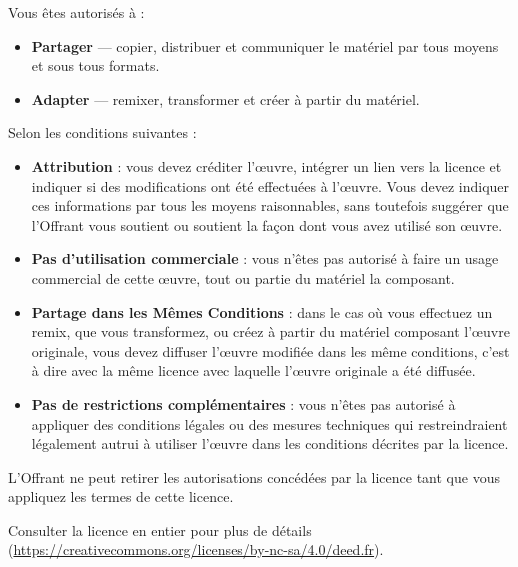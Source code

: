 \documentclass{article}
\begin{document}
\medskip

Vous êtes autorisés à :

\begin{itemize}
	\item \textbf{Partager} --- copier, distribuer et communiquer le matériel par tous moyens et sous tous formats.
	\item \textbf{Adapter} --- remixer, transformer et créer à partir du matériel.
\end{itemize}

\bigskip

Selon les conditions suivantes :

\begin{itemize}
	\item \textbf{Attribution} : vous devez créditer l'\oe{}uvre, intégrer un lien vers la licence et indiquer si des modifications ont été effectuées à l'\oe{}uvre. Vous devez indiquer ces informations par tous les moyens raisonnables, sans toutefois suggérer que l'Offrant vous soutient ou soutient la façon dont vous avez utilisé son \oe{}uvre. 
	\item \textbf{Pas d'utilisation commerciale} : vous n'êtes pas autorisé à faire un usage commercial de cette \oe{}uvre, tout ou partie du matériel la composant. 
	\item \textbf{Partage dans les Mêmes Conditions} : dans le cas où vous effectuez un remix, que vous transformez, ou créez à partir du matériel composant l'\oe{}uvre originale, vous devez diffuser l'\oe{}uvre modifiée dans les même conditions, c'est à dire avec la même licence avec laquelle l'\oe{}uvre originale a été diffusée.
	\item \textbf{Pas de restrictions complémentaires} : vous n'êtes pas autorisé à appliquer des conditions légales ou des mesures techniques qui restreindraient légalement autrui à utiliser l'\oe{}uvre dans les conditions décrites par la licence. 
\end{itemize}

\bigskip

L'Offrant ne peut retirer les autorisations concédées par la licence tant que vous appliquez les termes de cette licence.

\bigskip

Consulter la licence en entier pour plus de détails (\url{https://creativecommons.org/licenses/by-nc-sa/4.0/deed.fr}).


\end{document}
